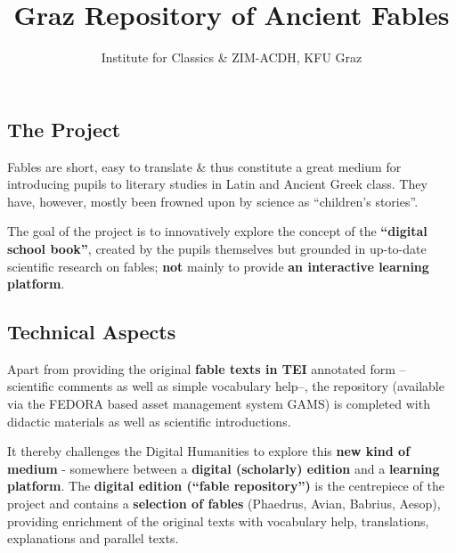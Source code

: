 \documentclass[14pt, a2paper, portrait,innermargin=5mm,
blockverticalspace=5mm, colspace=5mm, subcolspace=3mm]{tikzposter}
\title{{\rustfamily\bfseries Graz Repository of Ancient Fables}}
\author{Institute for Classics \& ZIM-ACDH, KFU Graz}
\begin{document}
\maketitle

{
\begin{minipage}[t]{0.35\textwidth}\vspace{0pt}

\subsection*{\Large The Project}
Fables are short, easy to translate \&  thus constitute a great medium for introducing pupils to literary studies in Latin and Ancient Greek class. They have, however, mostly been frowned upon by science as ``children’s stories''. 
\bigskip

The goal of the project is to innovatively explore the concept of the \textbf{``digital school book''}, created by the pupils themselves but grounded in up-to-date scientific research on fables; \textbf{not} mainly to provide \textbf{an interactive learning platform}. 

\subsection*{\Large Technical Aspects}
Apart from providing the original \textbf{fable texts in TEI} annotated form -- scientific comments as well as simple vocabulary help--, the repository (available via the FEDORA based asset management system GAMS) is completed with didactic materials as well as scientific introductions. 
\bigskip

It thereby challenges the Digital Humanities to explore this \textbf{new kind of medium} - somewhere between a \textbf{digital (scholarly) edition} and a \textbf{learning platform}. The \textbf{digital edition (``fable repository'')} is the centrepiece of the project and contains a \textbf{selection of fables} (Phaedrus, Avian, Babrius, Aesop), providing enrichment of the original texts with vocabulary help, translations, explanations and parallel texts. 


\end{minipage}\hfill\hspace{1em}
\begin{minipage}[t]{0.28\textwidth}\vspace{0pt}

\end{minipage}}
\end{document}
